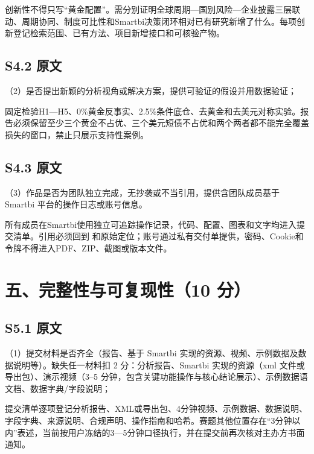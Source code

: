 \begin{decisionbox}[S4.1 怎么做]
创新性不得只写“黄金配置”。需分别证明全球周期—国别风险—企业披露三层联动、周期协同、制度可比性和Smartbi决策闭环相对已有研究新增了什么。每项创新登记检索范围、已有方法、项目新增接口和可核验产物。
\end{decisionbox}

\subsection*{S4.2 原文}
（2）是否提出新颖的分析视角或解决方案，提供可验证的假设并用数据验证；

\begin{decisionbox}[S4.2 怎么做]
固定检验H1—H5、0\%黄金反事实、2.5\%条件底仓、去黄金和去美元对称实验。报告必须保留至少三个黄金不占优、三个美元短债不占优和两个两者都不能完全覆盖损失的窗口，禁止只展示支持性案例。
\end{decisionbox}

\subsection*{S4.3 原文}
（3）作品是否为团队独立完成，无抄袭或不当引用，提供含团队成员基于 Smartbi 平台的操作日志或账号信息。

\begin{decisionbox}[S4.3 怎么做]
所有成员在Smartbi使用独立可追踪操作记录，代码、配置、图表和文字均进入提交清单。引用必须回到  和原始定位；账号通过私有交付单提供，密码、Cookie和令牌不得进入PDF、ZIP、截图或版本文件。
\end{decisionbox}

\section{五、完整性与可复现性（10 分）}

\subsection*{S5.1 原文}
（1）提交材料是否齐全（报告、基于 Smartbi 实现的资源、视频、示例数据及数据说明等）。缺失任一材料扣 2 分：分析报告、Smartbi 实现的资源（xml 文件或导出包）、演示视频（3–5 分钟，包含关键功能操作与核心结论展示）、示例数据语文档、数据字典/字段说明；

\begin{decisionbox}[S5.1 怎么做]
提交清单逐项登记分析报告、XML或导出包、4分钟视频、示例数据、数据说明、字段字典、来源说明、合规声明、操作指南和哈希。赛题其他位置存在“3分钟以内”表述，当前按用户冻结的3—5分钟口径执行，并在提交前再次核对主办方书面通知。
\end{decisionbox}

